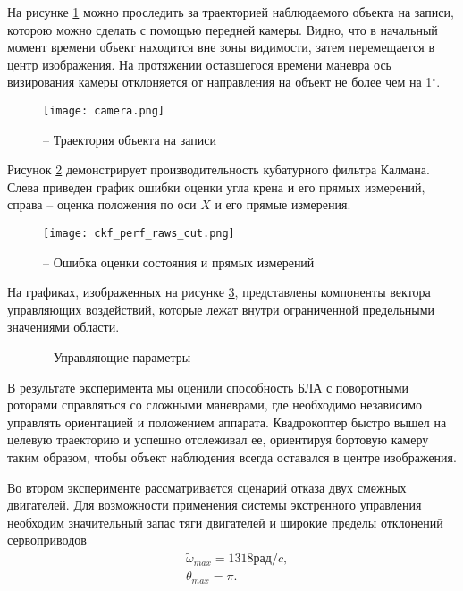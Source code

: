 На рисунке \ref{fig:mau_cam} можно проследить за траекторией наблюдаемого объекта на записи, которою можно сделать с помощью передней камеры.
Видно, что в начальный момент времени объект находится вне зоны видимости, затем перемещается в центр изображения.
На протяжении оставшегося времени маневра ось визирования камеры отклоняется от направления на объект не более чем на 1$^\circ$.
\begin{figure}[H]
	\centering
	\texttt{[image: camera.png]}
	\caption{ -- Траектория объекта на записи}
	\label{fig:mau_cam}
\end{figure}
Рисунок \ref{fig:mau_est} демонстрирует производительность кубатурного фильтра Калмана. Слева приведен график ошибки оценки угла крена и его прямых измерений, справа – оценка положения по оси $X$ и его прямые измерения.
\begin{figure}[H]
	\centering
	\texttt{[image: ckf\_perf\_raws\_cut.png]}
	\caption{ -- Ошибка оценки состояния и прямых измерений}
	\label{fig:mau_est}
\end{figure}

На графиках, изображенных на рисунке \ref{fig:mau_ctrl_out}, представлены компоненты вектора управляющих воздействий, которые лежат внутри ограниченной предельными значениями области.

\begin{figure}[H]
	\centering
	
	\caption{ -- Управляющие параметры}
	\label{fig:mau_ctrl_out}
	
\end{figure}


В результате эксперимента мы оценили способность БЛА с поворотными роторами справляться со сложными маневрами, где необходимо независимо управлять ориентацией и положением аппарата. Квадрокоптер быстро вышел на целевую траекторию и успешно отслеживал ее, ориентируя бортовую камеру таким образом, чтобы объект наблюдения всегда оставался в центре изображения.

Во втором эксперименте рассматривается сценарий отказа двух смежных двигателей. Для возможности применения системы экстренного управления необходим значительный запас тяги двигателей и широкие пределы отклонений сервоприводов
\begin{equation}
\begin{aligned}
&\tilde{\omega}_{max} = 1318 рад/c,
\\
&\theta_{max} = \pi.
\end{aligned}
\end{equation}

